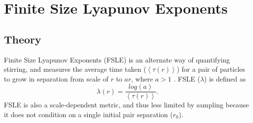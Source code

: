 \documentclass[]{ametsoc}
\begin{document}


\section{Finite Size Lyapunov Exponents} 
\subsection{Theory}
Finite Size Lyapunov Exponents (FSLE) is an alternate way of quantifying stirring, and measures the average time taken ($\left<\tau (r) \right>$) for a pair of particles to grow in separation from scale of $r$ to $ar$, where $a>1$ \citep{artale1997dispersion}. FSLE ($\lambda$) is defined as
\begin{equation}
\lambda(r) = \frac{log(a)}{\left< \tau(r) \right>}.
\end{equation}
FSLE is also a scale-dependent metric, and thus less limited by sampling because it does not condition on a single initial pair separation ($r_0$).
\end{document}
